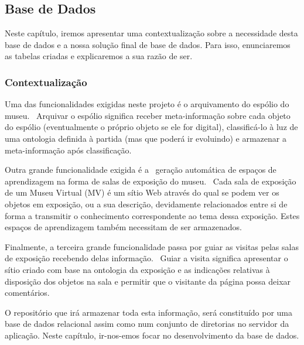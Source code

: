 \documentclass[letterpaper]{article}
\title{}
\author{Bruno Azevedo}
\date{2012-07-24}
\begin{document}
\subsection[Base de Dados]{ Base de Dados}
{
Neste cap\'itulo, iremos apresentar uma contextualiza\c{c}\~ao sobre a
necessidade desta base de dados e a nossa solu\c{c}\~ao final de base
de dados. Para isso, enunciaremos as tabelas criadas e explicaremos a
sua raz\~ao de ser.}


\bigskip

\subsubsection[Contextualiza\c{c}\~ao]{
Contextualiza\c{c}\~ao}
{
Uma das funcionalidades exigidas neste projeto \'e o arquivamento do
esp\'olio do museu. \ Arquivar o esp\'olio significa receber
meta-informa\c{c}\~ao sobre cada objeto do esp\'olio (eventualmente o
pr\'oprio objeto se ele for digital), classific\'a-lo \`a luz de uma
ontologia definida \`a partida (mas que poder\'a ir evoluindo) e
armazenar a meta-informa\c{c}\~ao ap\'os classifica\c{c}\~ao. }

{
Outra grande funcionalidade exigida \'e a \ gera\c{c}\~ao autom\'atica
de espa\c{c}os de aprendizagem na forma de salas de exposi\c{c}\~ao do
museu. \ Cada sala de exposi\c{c}\~ao de um Museu Virtual (MV) \'e um
s\'itio Web atrav\'es do qual se podem ver os objetos em
exposi\c{c}\~ao, ou a sua descri\c{c}\~ao, devidamente relacionados
entre si de forma a transmitir o conhecimento correspondente ao tema
dessa exposi\c{c}\~ao. Estes espa\c{c}os de aprendizagem tamb\'em
necessitam de ser armazenados.}

{
Finalmente, a terceira grande funcionalidade passa por guiar as visitas
pelas salas de exposi\c{c}\~ao recebendo delas informa\c{c}\~ao.
\ Guiar a visita significa apresentar o s\'itio criado com base na
ontologia da exposi\c{c}\~ao e as indica\c{c}\~oes relativas \`a
disposi\c{c}\~ao dos objetos na sala e permitir que o visitante da
p\'agina possa deixar coment\'arios.}


\bigskip

{
O reposit\'orio que ir\'a armazenar toda esta informa\c{c}\~ao, ser\'a
constitu\'ido por uma base de dados relacional assim como num conjunto
de diretorias no servidor da aplica\c{c}\~ao. Neste cap\'itulo,
ir-nos-emos focar no desenvolvimento da base de dados.}
\end{document}
